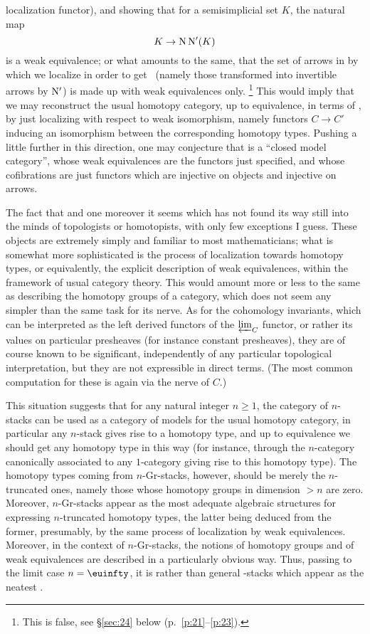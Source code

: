 localization functor), and showing that for a semisimplicial set $K$,
the natural map
\[ K \to \mathrm{N}\,\mathrm{N}' (K) \]
is a weak equivalence; or what amounts to the same, that the set of
arrows in \Sssets{} by which we localize in order to get \Cat\ (namely
those transformed into invertible arrows by $\mathrm{N}'$) is made up with
weak equivalences only.%
\footnote{ This is false, see \S\ref{sec:24} below (p.\
  \ref{p:21}--\ref{p:23}).} This would imply
that we may reconstruct the usual homotopy category, up to
equivalence, in terms of \Cat, by just localizing \Cat{}
with respect to weak isomorphism, namely functors $C \to C'$ inducing
an isomorphism between the corresponding homotopy types. Pushing a
little further in this direction, one may conjecture that \Cat{} is a
``closed model category'', whose weak equivalences are the functors
just specified, and whose cofibrations are just functors which are
injective on objects and injective on arrows.

The fact that  and one moreover it seems which has
not found its way still into the minds of topologists or homotopists,
with only few exceptions I guess. These objects are extremely simply
and familiar to most mathematicians; what is somewhat more
sophisticated is the process of localization towards homotopy types,
or equivalently, the explicit description of weak equivalences, within
the framework of usual category theory. This would amount more or less
to the same as describing the homotopy groups of a category, which
does not seem any simpler than the same task for its nerve. As for the
cohomology invariants, which can be interpreted as the left derived
functors of the $\varprojlim_C$ functor, or rather its values on
particular presheaves (for instance constant presheaves), they are of
course known to be significant, independently of any particular
topological interpretation, but they are not expressible in direct
terms. (The most common computation for these is again via the nerve
of $C$.)

This situation suggests that for any natural integer $n\ge1$, the
category of $n$-stacks can be used as a category of models for the
usual homotopy category, in particular any $n$-stack gives rise to a
homotopy type, and up to equivalence we should get any homotopy type
in this way (for instance, through the $n$-category canonically
associated to any $1$-category giving rise to this homotopy type). The
homotopy types coming from $n$-Gr-stacks, however, should be merely
the $n$-truncated ones, namely those whose homotopy groups in
dimension $>n$ are zero. Moreover, $n$-Gr-stacks appear as the most
adequate algebraic structures for expressing $n$-truncated homotopy
types, the latter being deduced from the former, presumably, by the
same process of localization by weak equivalences. Moreover, in the
context of $n$-Gr-stacks, the notions of homotopy groups and of weak
equivalences are described in a particularly obvious way. Thus,
passing to the limit case $n=\oo$, it is
 rather than general \oo-stacks which
appear as the neatest \scrcommentinline{model for homotopy types?}.

